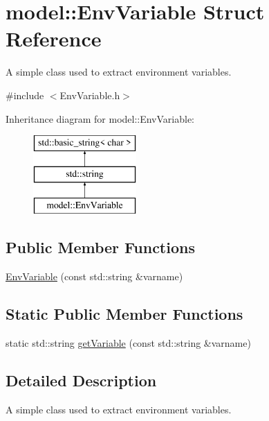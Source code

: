 \hypertarget{structmodel_1_1_env_variable}{}\section{model\+:\+:Env\+Variable Struct Reference}
\label{structmodel_1_1_env_variable}


A simple class used to extract environment variables.  




{\ttfamily \#include $<$Env\+Variable.\+h$>$}

Inheritance diagram for model\+:\+:Env\+Variable\+:\begin{figure}[H]
\begin{center}
\leavevmode
\includegraphics[height=3.000000cm]{structmodel_1_1_env_variable}
\end{center}
\end{figure}
\subsection*{Public Member Functions}
\begin{DoxyCompactItemize}
\item 
\hyperlink{structmodel_1_1_env_variable_a898f7ea03a84ac11ac53c62594d60aba}{Env\+Variable} (const std\+::string \&varname)
\end{DoxyCompactItemize}
\subsection*{Static Public Member Functions}
\begin{DoxyCompactItemize}
\item 
static std\+::string \hyperlink{structmodel_1_1_env_variable_a6b5e6e3d485d2542f3df973be3c8d445}{get\+Variable} (const std\+::string \&varname)
\end{DoxyCompactItemize}


\subsection{Detailed Description}
A simple class used to extract environment variables. 

